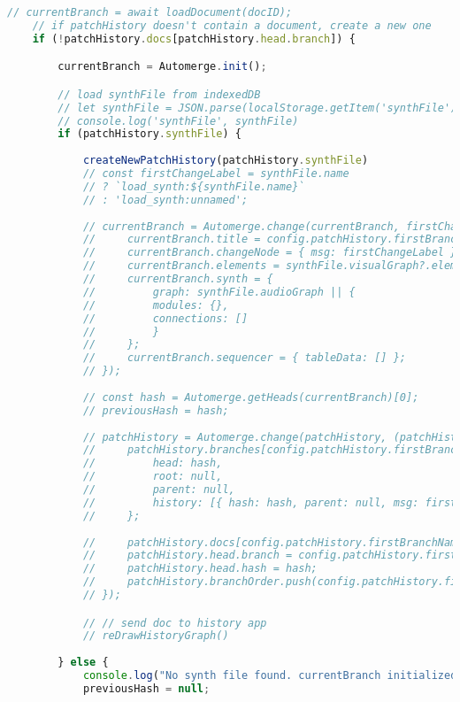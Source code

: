 \begin{lstlisting}[language=JavaScript, caption={Initial peer setup when joining a room}, label={lst:automerge-initialization}]
    // currentBranch = await loadDocument(docID);
    // if patchHistory doesn't contain a document, create a new one
    if (!patchHistory.docs[patchHistory.head.branch]) {

        currentBranch = Automerge.init();

        // load synthFile from indexedDB
        // let synthFile = JSON.parse(localStorage.getItem('synthFile'))
        // console.log('synthFile', synthFile)
        if (patchHistory.synthFile) {
           
            createNewPatchHistory(patchHistory.synthFile)
            // const firstChangeLabel = synthFile.name
            // ? `load_synth:${synthFile.name}`
            // : 'load_synth:unnamed';
        
            // currentBranch = Automerge.change(currentBranch, firstChangeLabel, (currentBranch) => {
            //     currentBranch.title = config.patchHistory.firstBranchName;
            //     currentBranch.changeNode = { msg: firstChangeLabel };
            //     currentBranch.elements = synthFile.visualGraph?.elements?.nodes || [];
            //     currentBranch.synth = {
            //         graph: synthFile.audioGraph || {
            //         modules: {},
            //         connections: []
            //         }
            //     };
            //     currentBranch.sequencer = { tableData: [] };
            // });
        
            // const hash = Automerge.getHeads(currentBranch)[0];
            // previousHash = hash;
        
            // patchHistory = Automerge.change(patchHistory, (patchHistory) => {
            //     patchHistory.branches[config.patchHistory.firstBranchName] = {
            //         head: hash,
            //         root: null,
            //         parent: null,
            //         history: [{ hash: hash, parent: null, msg: firstChangeLabel }]
            //     };
            
            //     patchHistory.docs[config.patchHistory.firstBranchName] = Automerge.save(currentBranch);
            //     patchHistory.head.branch = config.patchHistory.firstBranchName;
            //     patchHistory.head.hash = hash;
            //     patchHistory.branchOrder.push(config.patchHistory.firstBranchName);
            // });

            // // send doc to history app
            // reDrawHistoryGraph()
        
        } else {
            console.log("No synth file found. currentBranch initialized but not changed.");
            previousHash = null;


\end{lstlisting}
